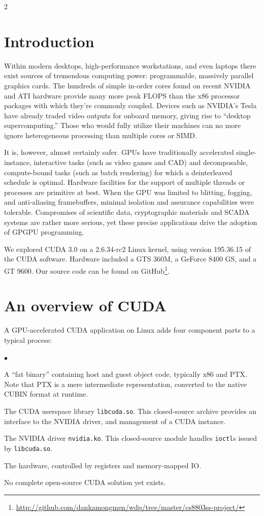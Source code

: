 \documentclass[letterpaper,10pt]{article}
\newcommand{\squishlist}{\begin{list}{$\bullet$}
  {\setlength{\itemsep}{0pt}
    \setlength{\parsep}{3pt}
    \setlength{\topsep}{3pt}
    \setlength{\partopsep}{0pt}
    \setlength{\leftmargin}{1.5em}
    \setlength{\labelwidth}{1em}
    \setlength{\labelsep}{0.5em}
  } }
\newcommand{\squishend}{\end{list}}
\begin{document}
\begin{multicols}{2}
\section{Introduction}
Within modern desktops, high-performance workstations, and even laptops there
exist sources of tremendous computing power: programmable, massively parallel graphics cards.
The hundreds of simple in-order cores found on recent NVIDIA and ATI hardware provide many more peak FLOPS than the x86 processor packages with
which they're commonly coupled.
Devices such as NVIDIA's Tesla\texttrademark{} have already traded video outputs for onboard memory, giving rise to ``desktop
supercomputing.'' Those who would fully utilize their machines can
no more ignore heterogeneous processing than multiple cores or SIMD\@.

It is, however, almost certainly safer. GPUs have traditionally accelerated
single-instance, interactive tasks (such as video games and CAD) and
decomposable, compute-bound tasks (such as batch rendering) for which a
deinterleaved schedule is optimal. Hardware facilities for the support of
multiple threads or processes are primitive at best. When the GPU was limited to
blitting, fogging, and anti-aliasing framebuffers, minimal isolation and
assurance capabilities were tolerable. Compromises of scientific data,
cryptographic materials and SCADA systems are rather more serious, yet these
precise applications drive the adoption of GPGPU programming. 

We explored CUDA 3.0 on a 2.6.34-rc2 Linux kernel, using version 195.36.15
of the CUDA software. Hardware included a GTS 360M, a GeForce 8400 GS, and a
GT 9600. Our source code can be found on GitHub\footnote{\url{http://github.com/dankamongmen/wdp/tree/master/cs8803ss-project/}}.

\section{An overview of CUDA}
A GPU-accelerated CUDA application on Linux adds four component parts to
a typical process:
\squishlist
\item A ``fat binary'' containing host and guest object code, typically x86 and PTX\cite{ptxguide}.
Note that PTX is a mere intermediate representation, converted to the native
CUBIN format at runtime.
\item The CUDA userspace library \texttt{libcuda.so}. This closed-source archive
provides an interface to the NVIDIA driver, and management of a CUDA instance.
\item The NVIDIA driver \texttt{nvidia.ko}. This closed-source module handles
\texttt{ioctl}s issued by \texttt{libcuda.so}.
\item The hardware, controlled by registers and memory-mapped IO.
\squishend
No complete open-source CUDA solution yet exists.


\end{multicols}
\end{document}

